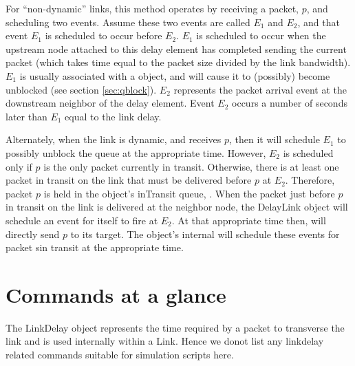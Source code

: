 For ``non-dynamic'' links,
this method operates by receiving a packet, $p$,  and scheduling two
events.
Assume these two events are called $E_1$ and $E_2$, and that
event $E_1$ is scheduled to occur before $E_2$.
$E_1$ is scheduled to occur when the upstream node attached to this
delay element has completed sending the current packet
(which takes time equal to the packet size divided by the link bandwidth).
$E_1$ is usually associated with a  object, and will
cause it to (possibly) become unblocked (see section \ref{sec:qblock}).
$E_2$ represents the packet arrival event at the downstream neighbor
of the delay element.
Event $E_2$ occurs a number of seconds later than $E_1$ equal to the
link delay.

Alternately, when the link is dynamic, and receives  $p$, then
it will schedule $E_1$ to possibly unblock the queue at the
appropriate time.
However, $E_2$ is scheduled only
if $p$ is the only packet currently in transit.
Otherwise, there is at least one packet in transit on the link that must
be delivered before $p$ at $E_2$.
Therefore, packet $p$ is held in the object's inTransit queue, .
When the packet just before $p$ in transit on the link is delivered
at the neighbor node, 
the DelayLink object will schedule an event for itself to fire at $E_2$.
At that appropriate time then, 
will directly send $p$ to its target.
The object's internal
will schedule these events for packet sin transit at the appropriate time.

\section{Commands at a glance}

The LinkDelay object represents the time required by a packet to
transverse the link and is used internally within a Link. Hence we donot
list any linkdelay related commands suitable for simulation scripts here.

